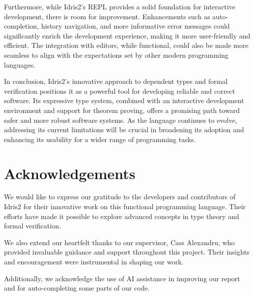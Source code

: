 \documentclass[]{rptuseminar}
\begin{document}
Furthermore, while Idris2's REPL provides a solid foundation for interactive development, there is room for improvement. Enhancements such as auto-completion, history navigation, and more informative error messages could significantly enrich the development experience, making it more user-friendly and efficient. The integration with editors, while functional, could also be made more seamless to align with the expectations set by other modern programming languages.

In conclusion, Idris2's innovative approach to dependent types and formal verification positions it as a powerful tool for developing reliable and correct software. Its expressive type system, combined with an interactive development environment and support for theorem proving, offers a promising path toward safer and more robust software systems. As the language continues to evolve, addressing its current limitations will be crucial in broadening its adoption and enhancing its usability for a wider range of programming tasks.

\section*{Acknowledgements}
We would like to express our gratitude to the developers and contributors of Idris2 for their innovative work on this functional programming language. Their efforts have made it possible to explore advanced concepts in type theory and formal verification.

We also extend our heartfelt thanks to our supervisor, Cass Alexandru, who provided invaluable guidance and support throughout this project. Their insights and encouragement were instrumental in shaping our work.

Additionally, we acknowledge the use of AI assistance in improving our report and for auto-completing some parts of our code.

\newpage
\nocite{*}



\end{document}

